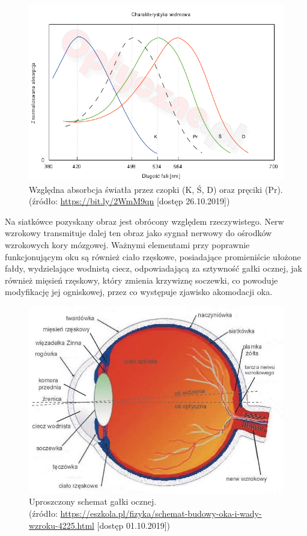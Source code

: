 \begin{figure}[H]
    \centering
    \captionsetup{justification=centering,margin=2cm}
    \includegraphics[width=0.9\linewidth]{resources/czopki.png}
    \caption[Względna absorbcja światła przez czopki oraz pręciki.]{Względna absorbcja światła przez czopki (K, Ś, D) oraz pręciki (Pr).\\\hspace{\textwidth}
    \small(źródło: \url{https://bit.ly/2WmM9qn} [dostęp 26.10.2019])}
    \label{fig:czopki}
\end{figure}
Na siatkówce pozyskany obraz jest obrócony względem rzeczywistego. Nerw wzrokowy transmituje dalej ten obraz jako sygnał nerwowy do ośrodków wzrokowych kory mózgowej. Ważnymi elementami przy poprawnie funkcjonującym oku są również ciało rzęskowe, posiadające promieniście ułożone fałdy, wydzielające wodnistą ciecz, odpowiadającą za sztywność gałki ocznej, jak również mięsień rzęskowy, który zmienia krzywiznę soczewki, co powoduje modyfikację jej ogniskowej, przez co występuje zjawisko akomodacji oka.
\begin{figure}[H]
    \centering
    \captionsetup{justification=centering,margin=2cm}
    \includegraphics[width=0.8\linewidth]{resources/oko_galka.jpg}
    \caption[Przekrój oka.]{Uproszczony schemat gałki ocznej.\\\hspace{\textwidth} 
    \small(źródło: \url{https://eszkola.pl/fizyka/schemat-budowy-oka-i-wady-wzroku-4225.html} [dostęp 01.10.2019])}
    \label{fig:budowaoka}
\end{figure}
